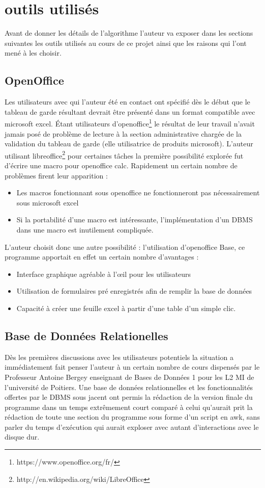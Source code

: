 \documentclass[11pt]{report}
\begin{document}
\section{outils utilisés}
Avant de donner les détails de l'algorithme l'auteur va exposer dans les sections suivantes les outils utilisés au cours de ce projet ainsi que les raisons qui l'ont mené à les choisir.
\subsection{OpenOffice}
	Les utilisateurs avec qui l'auteur été en contact ont spécifié dès le début que le tableau de garde résultant devrait être présenté dans un format compatible avec microsoft excel. 
Étant utilisateurs d'openoffice\footnote{https://www.openoffice.org/fr/} le résultat de leur travail n'avait jamais posé de problème de lecture à la section administrative chargée de la validation du tableau de garde (elle utilisatrice de produits microsoft).
L'auteur utilisant libreoffice\footnote{http://en.wikipedia.org/wiki/LibreOffice} pour certaines tâches la première possibilité explorée fut d'écrire une macro pour openoffice calc.
Rapidement un certain nombre de problèmes firent leur apparition : 
\begin{itemize}
\item Les macros fonctionnant sous openoffice ne fonctionneront pas nécessairement sous microsoft excel
\item Si la portabilité d'une macro est intéressante, l'implémentation d'un DBMS dans une macro est inutilement compliquée\cite{wheel}.
\end{itemize}

L'auteur choisit donc une autre possibilité : l'utilisation d'openoffice Base, ce programme apportait en effet un certain nombre d'avantages : 
\begin{itemize}
\item Interface graphique agréable à l'œil pour les utilisateurs
\item Utilisation de formulaires pré enregistrés afin de remplir la base de données
\item Capacité à créer une feuille excel à partir d'une table d'un simple clic.
\end{itemize}
\subsection{Base de Données Relationelles}
Dès les premières discussions avec les utilisateurs potentiels la situation a immédiatement fait penser l'auteur à un certain nombre de cours dispensés par le Professeur Antoine Bergey enseignant de Bases de Données 1 pour les L2 MI de l'université de Poitiers.
Une base de données relationnelles et les fonctionnalités offertes par le DBMS sous jacent ont permis la rédaction de la version finale du programme dans un temps extrêmement court comparé à celui qu'aurait prit la rédaction de toute une section du programme sous forme d'un script en awk, sans parler du temps d'exécution qui aurait exploser avec autant d'interactions avec le disque dur.
\end{document}
